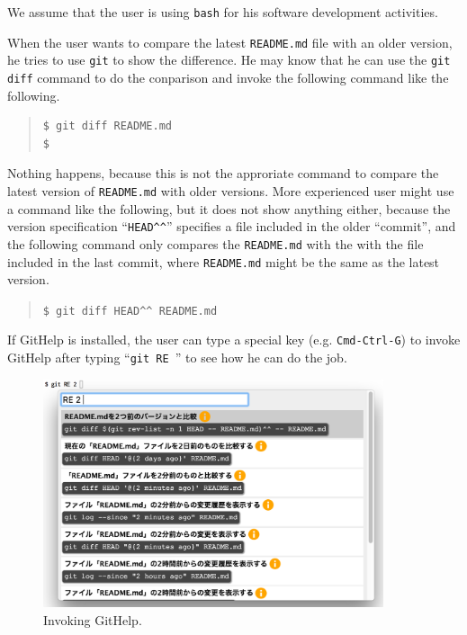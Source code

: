 \documentclass{sigchi}
\def\GH{\textsf{GitHelp}}
\begin{document}
We assume that the user is using \texttt{bash} for his software
development activities.


When the user wants to compare the latest \texttt{README.md} file with an
older version, he tries to use \texttt{git} to show the difference.
He may know that he can use the \texttt{git diff} command to do the
conparison and invoke the following command like the following.

\begin{quotation}
\begin{verbatim}
$ git diff README.md
$
\end{verbatim}
\end{quotation}

Nothing happens, because this is not the approriate command
to compare the latest version of \texttt{README.md}
with older versions.
%
More experienced user might use a command like the following,
but it does not show anything either, because the version specification
``\verb|HEAD^^|''
specifies a file included in the older ``commit'',
and the following command only compares the \texttt{README.md}
with the with the file included in the last commit, where
\texttt{README.md} might be the same as the latest version.

\begin{quotation}
  \verb|$ git diff HEAD^^ README.md|
\end{quotation}

If {\GH} is installed,
the user can type a special key (e.g. \texttt{Cmd-Ctrl-G}) to invoke {\GH}
after typing ``\verb|git RE |'' to see how he can do the job.

\begin{figure}[h]
  \includegraphics[width=10cm,bb=-100 -100 1190 766]{figures/githelp1.png}
  \caption{Invoking {\GH}.}
  \label{bash1}
\end{figure}
\end{document}
